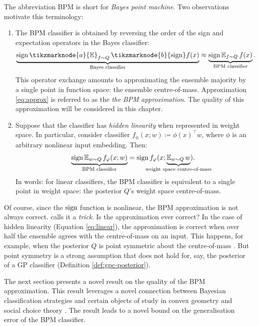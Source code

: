 \begin{refsection}
The abbreviation BPM is short for \textit{Bayes point machine}. Two observations motivate this terminology:
\begin{enumerate}
    \item The BPM classifier is obtained by reversing the order of the sign and expectation operators in the Bayes classifier:
\begin{equation}\label{eq:approx}
\underbrace{\sign \tikzmarknode{a}{\Expect}_{f\sim Q} \,\tikzmarknode{b}{\sign} f(x)}_{\text{Bayes classifier}} \approx \underbrace{\sign \Expect_{f\sim Q}f(x)}_{\text{BPM classifier}}.
\end{equation}%
This operator exchange amounts to approximating the ensemble majority by a single point in function space: the ensemble centre-of-mass. Approximation \ref{eq:approx} is referred to as the \textit{the BPM approximation}. The quality of this approximation will be considered in this chapter.
\item Suppose that the classifier has \textit{hidden linearity} when represented in weight space. In particular, consider classifier $f_{\mathrm{\phi}}(x;w) \coloneqq \phi(x)^\top w$, where $\phi$ is an arbitrary nonlinear input embedding. Then:
\begin{equation}\label{eq:linear}
\underbrace{\sign \Expect_{w\sim Q}f_\phi(x;w)}_{\text{BPM classifier}} = \sign f_\phi(x;\underbrace{\Expect_{w\sim Q}w}_{\mathclap{\text{weight space centre-of-mass}}}).
\end{equation}
In words: for linear classifiers, the BPM classifier is equivalent to a single point in weight space: the posterior $Q$'s weight space centre-of-mass.
\end{enumerate}

Of course, since the $\operatorname{sign}$ function is nonlinear, the BPM approximation is not always correct. \citet{herbrich_book} calls it a \textit{trick}. Is the approximation ever correct? In the case of hidden linearity (Equation \ref{eq:linear}), the approximation is correct when over half the ensemble agrees with the centre-of-mass on an input. This happens, for example, when the posterior $Q$ is point symmetric about the centre-of-mass \citep{herbrich_book}. But point symmetry is a strong assumption that does not hold for, say, the posterior of a GP classifier (Definition \ref{def:gpc-posterior}).

The next section presents a novel result on the quality of the BPM approximation. This result leverages a novel connection between Bayesian classification strategies and certain objects of study in convex geometry \citep{grunbaum} and social choice theory \citep{meanvoter}. The result leads to a novel bound on the generalisation error of the BPM classifier.


\end{refsection}
